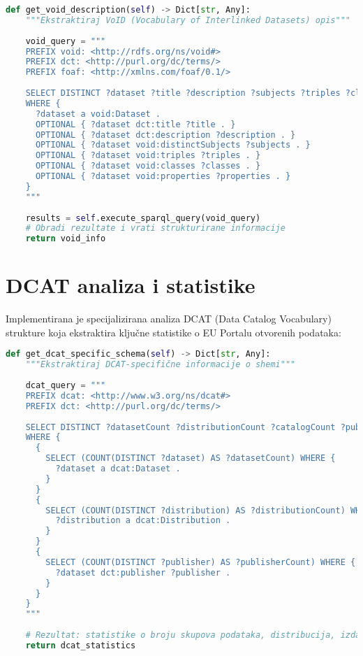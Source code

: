 \begin{lstlisting}[language=Python, caption=VoID deskriptor ekstrakcija]
def get_void_description(self) -> Dict[str, Any]:
    """Ekstraktiraj VoID (Vocabulary of Interlinked Datasets) opis"""
    
    void_query = """
    PREFIX void: <http://rdfs.org/ns/void#>
    PREFIX dct: <http://purl.org/dc/terms/>
    PREFIX foaf: <http://xmlns.com/foaf/0.1/>
    
    SELECT DISTINCT ?dataset ?title ?description ?subjects ?triples ?classes ?properties
    WHERE {
      ?dataset a void:Dataset .
      OPTIONAL { ?dataset dct:title ?title . }
      OPTIONAL { ?dataset dct:description ?description . }
      OPTIONAL { ?dataset void:distinctSubjects ?subjects . }
      OPTIONAL { ?dataset void:triples ?triples . }
      OPTIONAL { ?dataset void:classes ?classes . }
      OPTIONAL { ?dataset void:properties ?properties . }
    }
    """
    
    results = self.execute_sparql_query(void_query)
    # Obradi rezultate i vrati strukturirane informacije
    return void_info
\end{lstlisting}

\section{DCAT analiza i statistike}
\label{sec:dcat_analysis}

Implementirana je specijalizirana analiza DCAT (Data Catalog Vocabulary) strukture koja ekstraktira ključne statistike o EU Portalu otvorenih podataka:

\begin{lstlisting}[language=Python, caption=DCAT analiza]
def get_dcat_specific_schema(self) -> Dict[str, Any]:
    """Ekstraktiraj DCAT-specifične informacije o shemi"""
    
    dcat_query = """
    PREFIX dcat: <http://www.w3.org/ns/dcat#>
    PREFIX dct: <http://purl.org/dc/terms/>
    
    SELECT DISTINCT ?datasetCount ?distributionCount ?catalogCount ?publisherCount
    WHERE {
      {
        SELECT (COUNT(DISTINCT ?dataset) AS ?datasetCount) WHERE {
          ?dataset a dcat:Dataset .
        }
      }
      {
        SELECT (COUNT(DISTINCT ?distribution) AS ?distributionCount) WHERE {
          ?distribution a dcat:Distribution .
        }
      }
      {
        SELECT (COUNT(DISTINCT ?publisher) AS ?publisherCount) WHERE {
          ?dataset dct:publisher ?publisher .
        }
      }
    }
    """
    
    # Rezultat: statistike o broju skupova podataka, distribucija, izdavača
    return dcat_statistics
\end{lstlisting}

